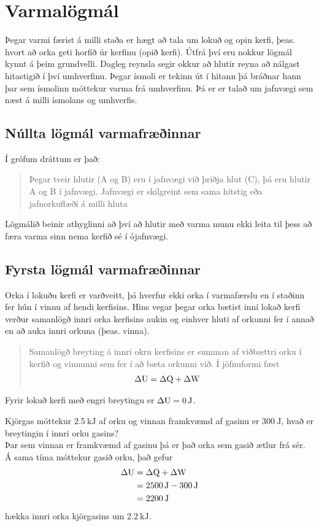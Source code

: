 %
%
\chapter{Varmalögmál}
Þegar varmi færist á milli staða er hægt að tala um lokuð og opin
kerfi, þeas. hvort að orka geti horfið úr kerfinu (opið kerfi).
Útfrá því eru nokkur lögmál kynnt á þeim grundvelli. Dagleg
reynsla segir okkur að hlutir reyna að nálgast hitastigið í
því umhverfinu. Þegar ísmoli er tekinn út í hitann þá bráðnar
hann þar sem ísmolinn móttekur varma frá umhverfinu. Þá er
er talað um jafnvægi sem næst á milli ísmolans og umhverfis.

\section{Núllta lögmál varmafræðinnar}
Í grófum dráttum er það:
\begin{quote}
	Þegar tveir hlutir (A og B) eru í jafnvægi við
	þriðja hlut (C), þá eru hlutir A og B í jafnvægi.
	Jafnvægi er skilgreint sem sama hitstig eða 
	jafnorkuflæði á milli hluta
\end{quote}
Lögmálið beinir athyglinni að því að hlutir með varma munu
ekki leita til þess að færa varma sinn nema kerfið sé í ójafnvægi.

\section{Fyrsta lögmál varmafræðinnar}
Orka í lokuðu kerfi er varðveitt, þá hverfur ekki orka í varmafærslu en í staðinn
fer hún í vinnu af hendi kerfisins. Hins vegar þegar orka bætist inní lokað
kerfi verður samanlögð innri orka kerfisins aukin og einhver hluti af orkunni
fer í annað en að auka innri orkuna (þeas. vinna).
\begin{quote}
	Samanlögð breyting á innri okru kerfisins er summan af viðbættri orku í 
	kerfið og vinnunni sem fer í að bæta orkunni við. Í jöfnuformi fæst
	\begin{align}
		\Delta \textrm{U} &= \Delta \text{Q} + \Delta \textrm{W}
	\end{align}
\end{quote}
Fyrir lokuð kerfi með engri breytingu er $\Delta \upotentialu = \SI{0}{\J}$. 
\begin{formalexample}
	Kjörgas móttekur $\SI{2.5}{\kJ}$ af orku og vinnan framkvæmd af gasinu
	er $\SI{300}{\J}$, hvað er breytingin í innri orku gasins?
	\\[4 ex]
	Þar sem vinnan er framkvæmd af gasinu þá er það orka sem gasið ætlur frá
	sér. Á sama tíma móttekur gasið orku, það gefur 
	\begin{align*}
		\Delta \upotentialu &= \Delta \uthermaleng + \Delta \uworkw \\
			&= \SI{2500}{\J} - \SI{300}{\J} \\
			&= \SI{2200}{\J}
	\end{align*}
	hækka innri orka kjörgasins um $\SI{2.2}{\kJ}$.
\end{formalexample}

